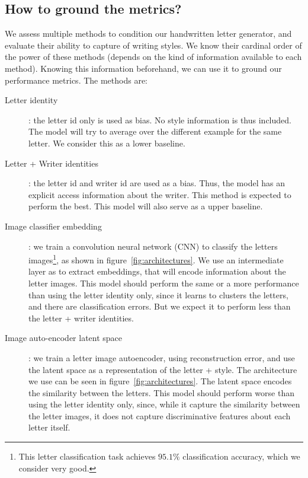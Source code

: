 \subsection{How to ground the metrics?}\label{subsec:ground_metrics}
\par We assess multiple methods to condition our handwritten letter generator, and evaluate their ability to capture of writing styles. We know their cardinal order of the power of these methods (depends on the kind of information available to each method). Knowing this information beforehand, we can use it to ground our performance metrics. The methods are:
\begin{description}
    \item[Letter identity]: the letter id only is used as bias. No style information is thus included. The model will try to average over the different example for the same letter. We consider this as a lower baseline.
    \item[Letter + Writer identities]: the letter id and writer id are used as a bias. Thus, the model has an explicit access information about the writer. This method is expected to perform the best. This model will also serve as a upper baseline.
    \item[Image classifier embedding]: we train a convolution neural network (CNN) to classify the letters images\footnote{This letter classification task achieves $95.1\%$ classification accuracy, which we consider very good.}, as shown in figure~\ref{fig:architectures}. We use an intermediate layer as to extract embeddings, that will encode information about the letter images. This model should perform the same or a more performance than using the letter identity only, since it learns to clusters the letters, and there are classification errors. But we expect it to perform less than the letter + writer identities.
    \item[Image auto-encoder latent space]: we train a letter image autoencoder, using reconstruction error, and use the latent space as a representation of the letter + style. The architecture we use can be seen in figure~\ref{fig:architectures}. The latent space encodes the similarity between the letters. This model should perform worse than using the letter identity only, since, while it capture the similarity between the letter images, it does not capture discriminative features about each letter itself.
\end{description}


